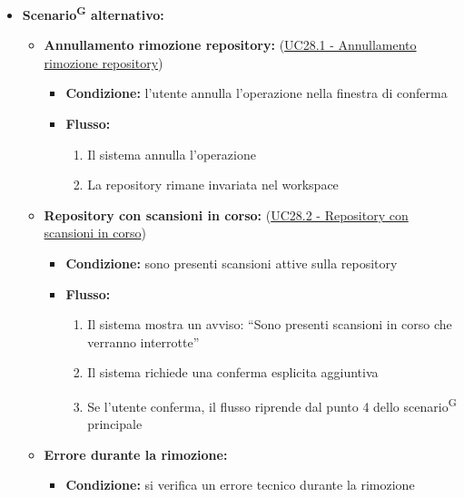 \documentclass[a4paper, 11pt]{article}
\begin{document}
\begin{itemize}
\begin{enumerate}
		\item Il sistema rimuove la repository dal workspace
		\item Il sistema elimina tutti i dati di analisi, scansioni, configurazioni associate alla repository
		\item Il sistema aggiorna la visualizzazione e mostra un messaggio di conferma dell'avvenuta rimozione
	\end{enumerate}
	\item \textbf{Scenario\textsuperscript{G} alternativo:}
	\begin{itemize}
		\item \textbf{Annullamento rimozione repository:} (\hyperref[UC28.1]{UC28.1 - Annullamento rimozione repository})
			\begin{itemize}
				\item \textbf{Condizione:} l'utente annulla l'operazione nella finestra di conferma
				\item \textbf{Flusso:}
				\begin{enumerate}
					\item Il sistema annulla l'operazione
					\item La repository rimane invariata nel workspace
				\end{enumerate}
			\end{itemize}
		\item \textbf{Repository con scansioni in corso:} (\hyperref[UC28.2]{UC28.2 - Repository con scansioni in corso})
			\begin{itemize}
				\item \textbf{Condizione:} sono presenti scansioni attive sulla repository
				\item \textbf{Flusso:}
				\begin{enumerate}
					\item Il sistema mostra un avviso: “Sono presenti scansioni in corso che verranno interrotte”
					\item Il sistema richiede una conferma esplicita aggiuntiva
					\item Se l'utente conferma, il flusso riprende dal punto 4 dello scenario\textsuperscript{G} principale
				\end{enumerate}
			\end{itemize}
		\item \textbf{Errore durante la rimozione:}
			\begin{itemize}
				\item \textbf{Condizione:} si verifica un errore tecnico durante la rimozione

\end{itemize}
\end{itemize}
\end{itemize}
\end{document}
